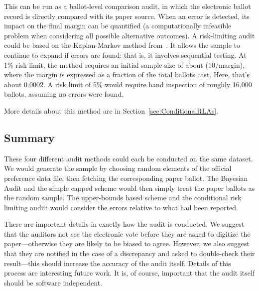 \documentclass[10pt,a4paper]{article}
\newcommand{\shortVersion}[1]{}
\newcommand{\longVersion}[1]{#1}
\newcommand{\shortVersion}[1]{#1}
\newcommand{\longVersion}[1]{}
\begin{document}
This can be run as a ballot-level comparison audit, in which the electronic ballot record is directly compared with its paper source.  When an error is detected, its impact on the final margin can be quantified  (a computationally infeasible problem when considering all possible alternative outcomes).  
A risk-limiting audit could be based on the Kaplan-Markov  method from~\cite{stark2008conservative}.  It allows the sample to continue to expand if errors are found: that is, it involves sequential testing. 
At 1\% risk limit, the method requires an initial sample size of about (10/margin), where the margin is expressed as a fraction of the total ballots cast. Here, that's about 0.0002.
A risk limit of 5\% would require hand inspection of roughly 16,000 ballots, assuming no errors were found.

\shortVersion{}\longVersion{More details about this method are in Section~\ref{sec:ConditionalRLAs}.}

\subsection{Summary}
These four different audit methods could each be conducted on the same dataset.  We would generate the sample by choosing random elements of the official preference data file, then fetching the corresponding paper ballot.  The Bayesian Audit and the simple capped scheme would then simply treat the paper ballots as the random sample.  The upper-bounds based scheme and the conditional risk limiting audiit would consider the errors relative to what had been reported.

There are important details in exactly how the audit is conducted.  We suggest that the auditors not see the electronic vote before they are asked to digitize the paper---otherwise they are likely to be biased to agree.  However, we also suggest that they are notified in the case of a discrepancy and asked to double-check their result---this should increase the accuracy of the audit itself.  Details of this process are interesting future work.  It is, of course, important that the audit itself should be software independent.
\end{document}
